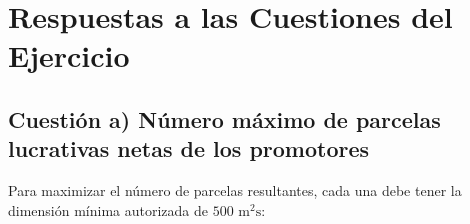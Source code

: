 \documentclass[11pt,a4paper]{article}
\begin{document}
\section{Respuestas a las Cuestiones del Ejercicio}

\subsection{Cuestión a) Número máximo de parcelas lucrativas netas de los promotores}

Para maximizar el número de parcelas resultantes, cada una debe tener la dimensión mínima autorizada de \textbf{$500\text{ m}^2\text{s}$}:
\end{document}
